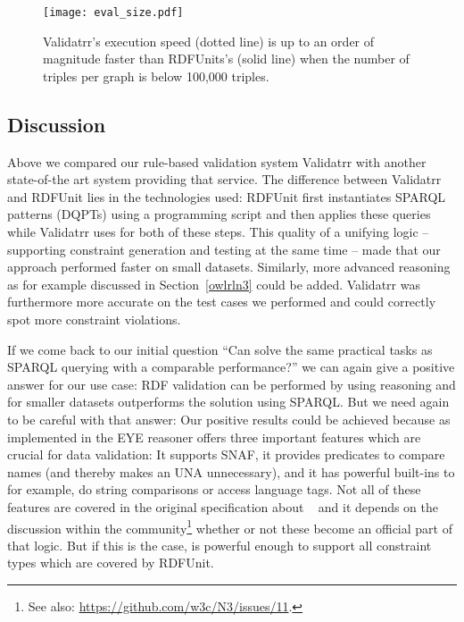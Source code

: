 \begin{figure}[t]
    \texttt{[image: eval\_size.pdf]}
\caption{Validatrr's execution speed (dotted line) is up to an order of magnitude faster than RDFUnits's (solid line) when the number of triples per \rdf graph is below 100,000 triples.}
	\label{fig:eval-size}
\end{figure}


\subsection{Discussion}\label{conc}
Above we compared our rule-based \rdf validation system Validatrr with another state-of-the art system providing that service. The difference between Validatrr and RDFUnit 
lies in the technologies used: RDFUnit first instantiates SPARQL patterns (DQPTs) using a programming script and then applies these queries 
while Validatrr uses \nthreelogic for both of these steps. %
This quality of a unifying logic -- supporting constraint generation and testing at the same time -- made that our approach performed faster on small datasets. Similarly,
more advanced reasoning as for example
discussed in Section~\ref{owlrln3} could be added.
Validatrr was furthermore more accurate on the test cases we 
performed and could correctly spot more constraint violations.

If we come back to our initial question ``Can \nthree solve the same practical tasks as SPARQL querying with a comparable performance?'' 
we can again give a positive answer for our use case: RDF validation can 
be performed by using \nthree reasoning and for smaller datasets \nthree outperforms the solution using SPARQL. 
But we need again to be careful with that answer: 
Our positive results could be achieved because \nthree as implemented in the EYE reasoner 
offers three important features which are crucial for data validation: It supports SNAF, it provides predicates to compare names (and thereby makes an UNA unnecessary), and it
has powerful built-ins to for example, 
do string comparisons or access language tags. Not all of these features are covered in the original specification 
about \nthreelogic~\cite{Notation3,N3Logic} and it depends on the discussion within the community\footnote{See also: \url{https://github.com/w3c/N3/issues/11}.} whether or not these
become an official part of that logic. But if this is the case, \nthree is powerful enough to support all constraint types which are covered by RDFUnit.


